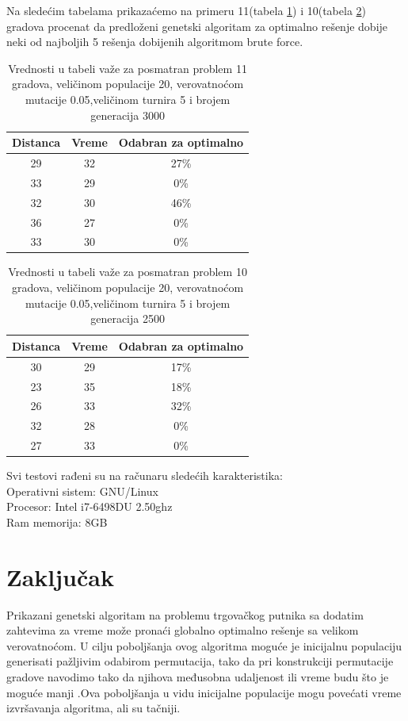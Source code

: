 \documentclass[a4paper]{article}
\begin{document}
Na sledećim tabelama prikazaćemo na primeru 11(tabela \ref{tab:tabela1}) i 10(tabela \ref{tab:tabela2}) gradova procenat da predloženi genetski algoritam za optimalno rešenje dobije neki od najboljih 5 rešenja dobijenih algoritmom brute force.

\begin{table}[h!]
\begin{center}
\caption{Vrednosti u tabeli važe za posmatran problem 11 gradova, veličinom populacije 20, verovatnoćom mutacije 0.05,veličinom turnira 5 i brojem generacija 3000}
\begin{tabular}{|c|c|c|} \hline
Distanca& Vreme & Odabran za optimalno\\ \hline
 29& 32& 27\%\\ \hline
 33& 29& 0\%\\ \hline
 32& 30& 46\%\\ \hline
 36& 27& 0\%\\ \hline
 33& 30& 0\%\\ \hline
\end{tabular}
\label{tab:tabela1}
\end{center}
\end{table}

\begin{table}[h!]
\begin{center}
\caption{Vrednosti u tabeli važe za posmatran problem 10 gradova, veličinom populacije 20, verovatnoćom mutacije 0.05,veličinom turnira 5 i brojem generacija 2500}
\begin{tabular}{|c|c|c|} \hline
Distanca& Vreme & Odabran za optimalno\\ \hline
 30& 29& 17\%\\ \hline
 23& 35& 18\%\\ \hline
 26& 33& 32\%\\ \hline
 32& 28& 0\%\\ \hline
 27& 33& 0\%\\ \hline
\end{tabular}
\label{tab:tabela2}
\end{center}
\end{table}
\newpage
Svi testovi rađeni su na računaru sledećih karakteristika:\\
Operativni sistem: GNU/Linux\\
Procesor: Intel i7-6498DU 2.50ghz\\
Ram memorija: 8GB\\


\section{Zaključak}
Prikazani genetski algoritam na problemu trgovačkog putnika sa dodatim zahtevima za vreme može pronaći globalno optimalno rešenje sa velikom verovatnoćom. U cilju poboljšanja ovog algoritma moguće je inicijalnu populaciju generisati pažljivim odabirom permutacija, tako da pri konstrukciji permutacije gradove navodimo tako da njihova međusobna udaljenost ili vreme budu što je moguće manji \cite{3}.Ova poboljšanja u vidu inicijalne populacije mogu povećati vreme izvršavanja algoritma, ali su tačniji.
\label{sec:zakljucak}

\newpage

\appendix
 


\appendix
\end{document}
